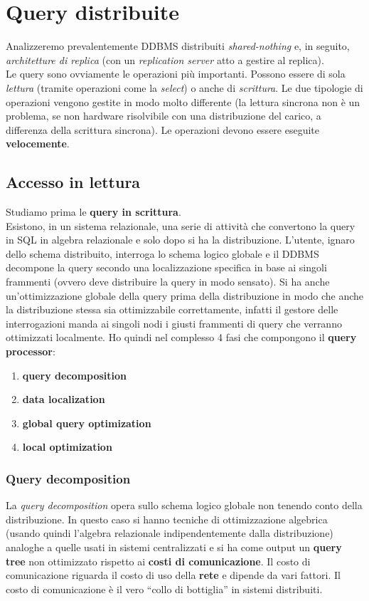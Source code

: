 \documentclass[a4paper,12pt, oneside]{book}
\begin{document}
\section{Query distribuite}
Analizzeremo prevalentemente DDBMS distribuiti \textit{shared-nothing} e, in
seguito, \textit{architetture di replica} (con un \textit{replication server}
atto a gestire al replica).\\
Le query sono ovviamente le operazioni più importanti. Possono essere di sola
\textit{lettura} (tramite operazioni come la \textit{select}) o anche di
\textit{scrittura}. Le due tipologie di operazioni vengono gestite in modo
molto differente (la lettura sincrona non è un problema, se non hardware
risolvibile con una distribuzione del carico, a differenza della scrittura
sincrona). Le operazioni devono essere eseguite \textbf{velocemente}.
\subsection{Accesso in lettura}
Studiamo prima le \textbf{query in scrittura}.\\
Esistono, in un sistema relazionale, una serie di attività che convertono la
query in SQL in algebra relazionale e solo dopo si ha la distribuzione. 
L'utente, ignaro dello schema distribuito, interroga lo schema
logico globale e il DDBMS decompone la query secondo una localizzazione
specifica in base ai singoli frammenti (ovvero deve distribuire la query in modo
sensato). Si ha anche un'ottimizzazione globale della query prima della
distribuzione in modo che anche la distribuzione stessa sia ottimizzabile
correttamente, infatti il gestore delle interrogazioni manda ai singoli nodi i
giusti frammenti di query che verranno ottimizzati localmente. Ho quindi nel
complesso 4 fasi che compongono il \textbf{query processor}:
\begin{enumerate}
  \item \textbf{query decomposition}
  \item \textbf{data localization}
  \item \textbf{global query optimization}
  \item \textbf{local optimization}
\end{enumerate}
\subsubsection{Query decomposition}
La \textit{query decomposition} opera sullo schema logico globale non tenendo
conto della distribuzione. In questo caso si hanno tecniche di ottimizzazione
algebrica (usando quindi l'algebra relazionale indipendentemente dalla
distribuzione) analoghe a quelle usati in sistemi centralizzati e si ha come
output un \textbf{query tree} non ottimizzato rispetto ai \textbf{costi di
comunicazione}. Il costo di comunicazione riguarda il costo di uso della
\textbf{rete} e dipende da vari fattori. Il costo di comunicazione è il vero
``collo di bottiglia'' in sistemi distribuiti.
\end{document}
